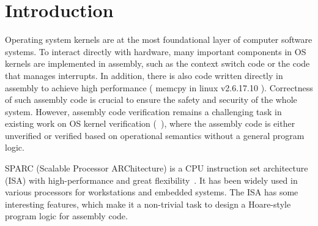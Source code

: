 \section{Introduction}

Operating system kernels are at
the most foundational layer of computer software systems.
To interact directly with hardware,
many important components in OS kernels are implemented
in assembly, such as the context switch code or the code that
manages interrupts.
In addition, there is also code written directly in assembly
to achieve high performance (\eg{} \textsf{memcpy} in linux
v2.6.17.10 \cite{linuxv2.6.17.10}).
Correctness of such assembly code is crucial to ensure
the safety and security of the whole system.
However, assembly code verification remains a challenging
task in existing work on OS kernel verification
(\eg~\cite{Xu16cav, sel4, deepspec}),
where the assembly code is either unverified or verified based on
operational semantics without a general program logic.

SPARC (Scalable Processor ARChitecture)
is a CPU instruction set architecture (ISA) with high-performance
and great flexibility~\cite{sparc}.
It has been widely used in various processors
for workstations and embedded systems. %
The \sparc{} ISA has some interesting features, which
make it a non-trivial task to design a Hoare-style
program logic for assembly code.

